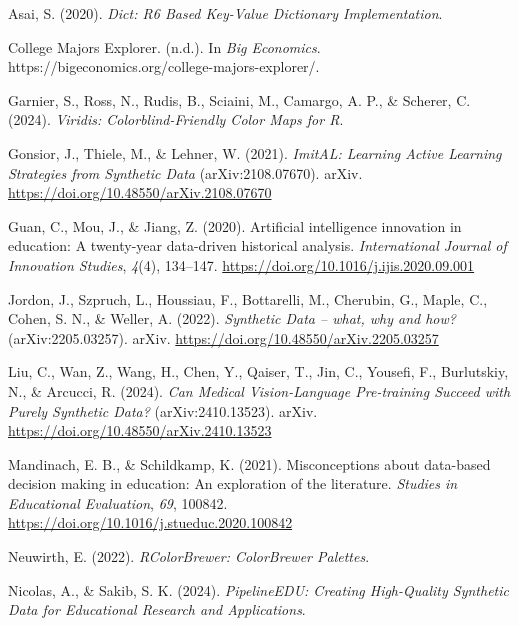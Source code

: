 \documentclass{article}
\newlength{\cslhangindent}
\newenvironment{CSLReferences}[2] %
 {\begin{list}{}{%
  \setlength{\itemindent}{0pt}
  \setlength{\leftmargin}{0pt}
  \setlength{\parsep}{0pt}
  \ifodd #1
   \setlength{\leftmargin}{\cslhangindent}
   \setlength{\itemindent}{-1\cslhangindent}
  \fi
  \setlength{\itemsep}{#2\baselineskip}}}
 {\end{list}}
\begin{document}
\label{refs}
\begin{CSLReferences}{1}{0}
Asai, S. (2020). \emph{Dict: {R6 Based Key-Value Dictionary Implementation}}.

College {Majors Explorer}. (n.d.). In \emph{Big Economics}. https://bigeconomics.org/college-majors-explorer/.

Garnier, S., Ross, N., Rudis, B., Sciaini, M., Camargo, A. P., \& Scherer, C. (2024). \emph{Viridis: {Colorblind-Friendly Color Maps} for {R}}.

Gonsior, J., Thiele, M., \& Lehner, W. (2021). \emph{{ImitAL}: {Learning Active Learning Strategies} from {Synthetic Data}} (arXiv:2108.07670). arXiv. \url{https://doi.org/10.48550/arXiv.2108.07670}

Guan, C., Mou, J., \& Jiang, Z. (2020). Artificial intelligence innovation in education: {A} twenty-year data-driven historical analysis. \emph{International Journal of Innovation Studies}, \emph{4}(4), 134--147. \url{https://doi.org/10.1016/j.ijis.2020.09.001}

Jordon, J., Szpruch, L., Houssiau, F., Bottarelli, M., Cherubin, G., Maple, C., Cohen, S. N., \& Weller, A. (2022). \emph{Synthetic {Data} -- what, why and how?} (arXiv:2205.03257). arXiv. \url{https://doi.org/10.48550/arXiv.2205.03257}

Liu, C., Wan, Z., Wang, H., Chen, Y., Qaiser, T., Jin, C., Yousefi, F., Burlutskiy, N., \& Arcucci, R. (2024). \emph{Can {Medical Vision-Language Pre-training Succeed} with {Purely Synthetic Data}?} (arXiv:2410.13523). arXiv. \url{https://doi.org/10.48550/arXiv.2410.13523}

Mandinach, E. B., \& Schildkamp, K. (2021). Misconceptions about data-based decision making in education: {An} exploration of the literature. \emph{Studies in Educational Evaluation}, \emph{69}, 100842. \url{https://doi.org/10.1016/j.stueduc.2020.100842}

Neuwirth, E. (2022). \emph{{RColorBrewer}: {ColorBrewer Palettes}}.

Nicolas, A., \& Sakib, S. K. (2024). \emph{{PipelineEDU}: {Creating High-Quality Synthetic Data} for {Educational Research} and {Applications}}.


\end{CSLReferences}
\end{document}
